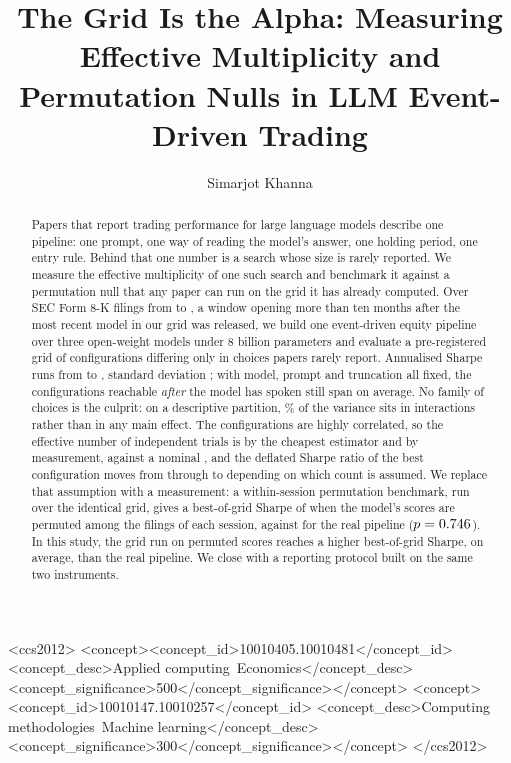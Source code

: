 \documentclass[sigconf]{acmart}
\begin{document}
\title{The Grid Is the Alpha: Measuring Effective Multiplicity and
Permutation Nulls in LLM Event-Driven Trading}

\author{Simarjot Khanna}

\begin{abstract}
Papers that report trading performance for large language models describe one pipeline: one prompt,
one way of reading the model's answer, one holding period, one entry rule. Behind that one number is
a search whose size is rarely reported. We measure the effective multiplicity of one such search and
benchmark it against a permutation null that any paper can run on the grid it has already computed.
Over \NumEvents{} SEC Form 8-K filings from \FirstSession{} to \LastSession{}, a window opening more
than ten months after the most recent model in our grid was released, we build one event-driven
equity pipeline over three open-weight models under 8 billion parameters and evaluate a
pre-registered grid of \NumConfigs{} configurations differing only in choices papers rarely report. Annualised Sharpe runs from \SharpeMin{} to \SharpeMax{}, standard
deviation \SharpeSD{}; with model, prompt and truncation all fixed, the \NumPostConfigs{}
configurations reachable \emph{after} the model has spoken still span \PostOnlyRange{} on average.
No family of choices is the culprit: on a descriptive partition, \VarShareInteractions{}\% of the
variance sits in interactions rather than in any main effect. The configurations are highly correlated, so the effective number of
independent
trials is \Neff{} by the cheapest estimator and \NImplied{} by measurement, against a nominal
\NumConfigs{}, and the deflated Sharpe ratio of the best configuration moves from \DSRone{} through
\DSRimplied{} to \DSRfull{} depending on which count is assumed. We
replace that assumption with a measurement: a within-session permutation benchmark, run over the
identical grid, gives a best-of-grid Sharpe of \NullMaxMean{} when the model's scores are permuted
among the filings of each session, against \SharpeBest{} for the real pipeline
($p=0.746{}$). In this study, the grid run on permuted scores reaches a higher best-of-grid
Sharpe, on average, than the real pipeline. We close with a reporting protocol built on the
same two instruments.
\end{abstract}

\begin{CCSXML}
<ccs2012>
<concept><concept_id>10010405.10010481</concept_id>
<concept_desc>Applied computing~Economics</concept_desc><concept_significance>500</concept_significance></concept>
<concept><concept_id>10010147.10010257</concept_id>
<concept_desc>Computing methodologies~Machine learning</concept_desc><concept_significance>300</concept_significance></concept>
</ccs2012>
\end{CCSXML}
\end{document}
